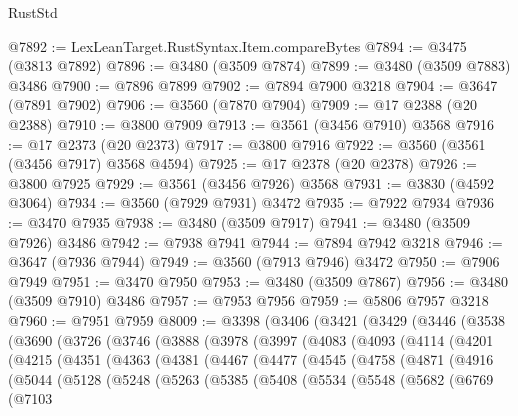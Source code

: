 \begin{lexlean}{RustStd}
\begin{coremodule}
{\begin{coremodule}
{{{{{{{{{{{{{{{{{{{{{{{{{{{{{{{{{{{{{{{{{{{{{@7892 := LexLeanTarget.RustSyntax.Item.compareBytes
@7894 := @3475 (@3813 @7892)
@7896 := @3480 (@3509 @7874)
@7899 := @3480 (@3509 @7883) @3486
@7900 := @7896 @7899
@7902 := @7894 @7900 @3218
@7904 := @3647 (@7891 @7902)
@7906 := @3560 (@7870 @7904)
@7909 := @17 @2388 (@20 @2388)
@7910 := @3800 @7909
@7913 := @3561 (@3456 @7910) @3568
@7916 := @17 @2373 (@20 @2373)
@7917 := @3800 @7916
@7922 := @3560 (@3561 (@3456 @7917) @3568 @4594)
@7925 := @17 @2378 (@20 @2378)
@7926 := @3800 @7925
@7929 := @3561 (@3456 @7926) @3568
@7931 := @3830 (@4592 @3064)
@7934 := @3560 (@7929 @7931) @3472
@7935 := @7922 @7934
@7936 := @3470 @7935
@7938 := @3480 (@3509 @7917)
@7941 := @3480 (@3509 @7926) @3486
@7942 := @7938 @7941
@7944 := @7894 @7942 @3218
@7946 := @3647 (@7936 @7944)
@7949 := @3560 (@7913 @7946) @3472
@7950 := @7906 @7949
@7951 := @3470 @7950
@7953 := @3480 (@3509 @7867)
@7956 := @3480 (@3509 @7910) @3486
@7957 := @7953 @7956
@7959 := @5806 @7957 @3218
@7960 := @7951 @7959
@8009 := @3398
    (@3406
      (@3421
        (@3429
          (@3446
            (@3538
              (@3690
                (@3726
                  (@3746
                    (@3888
                      (@3978
                        (@3997
                          (@4083
                            (@4093
                              (@4114
                                (@4201
                                  (@4215
                                    (@4351
                                      (@4363
                                        (@4381
                                          (@4467
                                            (@4477
                                              (@4545
                                                (@4758
                                                  (@4871
                                                    (@4916
                                                      (@5044
                                                        (@5128
                                                          (@5248
                                                            (@5263
                                                              (@5385
                                                                (@5408
                                                                  (@5534
                                                                    (@5548
                                                                      (@5682
                                                                        (@6769
                                                                          (@7103
}}}}}}}}}}}}}}}}}}}}}}}}}}}}}}}}}}}}}}}}}}}}}
\end{coremodule}}
\end{coremodule}
\end{lexlean}
